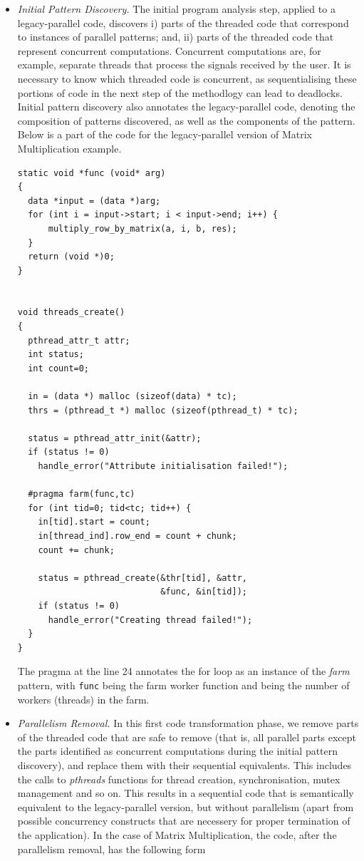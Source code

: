 \begin{itemize}
\item \emph{Initial Pattern Discovery.} The initial program analysis step, applied to a legacy-parallel code, discovers i) parts of the threaded code that correspond to instances of parallel patterns; and, ii) parts of the threaded code that represent concurrent computations. Concurrent computations are, for example, separate threads that process the signals received by the user. It is necessary to know which threaded code is concurrent, as sequentialising these portions of code in the next step of the methodlogy can lead to deadlocks. Initial pattern discovery also annotates the legacy-parallel code, denoting the composition of patterns discovered, as well as the components of the pattern. Below is a part of the code for the legacy-parallel version of Matrix Multiplication example.

\begin{lstlisting}
static void *func (void* arg)
{
  data *input = (data *)arg;
  for (int i = input->start; i < input->end; i++) {
	  multiply_row_by_matrix(a, i, b, res);
  }
  return (void *)0;
}


void threads_create()
{
  pthread_attr_t attr;
  int status;
  int count=0;
  
  in = (data *) malloc (sizeof(data) * tc);
  thrs = (pthread_t *) malloc (sizeof(pthread_t) * tc);
  
  status = pthread_attr_init(&attr);
  if (status != 0)
    handle_error("Attribute initialisation failed!");

  #pragma farm(func,tc)   
  for (int tid=0; tid<tc; tid++) {  
    in[tid].start = count;
    in[thread_ind].row_end = count + chunk;
    count += chunk;

    status = pthread_create(&thr[tid], &attr,
                            &func, &in[tid]);
    if (status != 0)
      handle_error("Creating thread failed!");
  }
}

\end{lstlisting}

The pragma at the line 24 annotates the for loop as an instance of the \emph{farm} pattern, with \lstinline{func} being the farm worker function and  being the number of workers (threads) in the farm.

\item \emph{Parallelism Removal.} In this first code transformation phase, we remove parts of the threaded code that are safe to remove (that is, all parallel parts except the parts identified as concurrent computations during the initial pattern discovery), and replace them with their sequential equivalents. This includes the calls to \emph{pthreads} functions for thread creation, synchronisation, mutex management and so on. This results in a sequential code that is semantically equivalent to the legacy-parallel version, but without parallelism (apart from possible concurrency constructs that are necessery for proper termination of the application). In the case of Matrix Multiplication, the code, after the parallelism removal, has the following form


\end{itemize}
